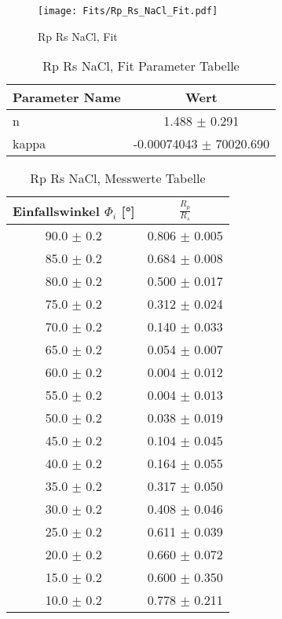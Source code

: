 \begin{figure}[ht] 
 	\centering 
 	\texttt{[image: Fits/Rp\_Rs\_NaCl\_Fit.pdf]} 
	\caption{Rp Rs NaCl, Fit} 
 	\label{fig:Rp Rs NaCl, Fit} 
\end{figure}
 
\begin{table}[ht] 
	\centering 
	\caption{Rp Rs NaCl, Fit Parameter Tabelle} 
	\label{tab: Rp Rs NaCl, Fit Parameter Tabelle}
	\begin{tabular}{|l|c|}
		\hline
		Parameter Name	&	Wert \\ \hline
		n	&	 1.488 $\pm$  0.291\\ \hline
		kappa	&	-0.00074043 $\pm$  70020.690\\ \hline
	\end{tabular} 
\end{table}
 
\begin{table}[ht] 
	\centering 
	\caption{Rp Rs NaCl, Messwerte Tabelle} 
	\label{tab: Rp Rs NaCl, Messwerte Tabelle}
	\begin{tabular}{|c|c|}
		\hline
		Einfallswinkel $\Phi_i$ [°] 	&	 $\frac{R_p}{R_s}$\\ \hline
		90.0 $\pm$ 0.2 	&	 0.806 $\pm$ 0.005 \\ \hline
		85.0 $\pm$ 0.2 	&	 0.684 $\pm$ 0.008 \\ \hline
		80.0 $\pm$ 0.2 	&	 0.500 $\pm$ 0.017 \\ \hline
		75.0 $\pm$ 0.2 	&	 0.312 $\pm$ 0.024 \\ \hline
		70.0 $\pm$ 0.2 	&	 0.140 $\pm$ 0.033 \\ \hline
		65.0 $\pm$ 0.2 	&	 0.054 $\pm$ 0.007 \\ \hline
		60.0 $\pm$ 0.2 	&	 0.004 $\pm$ 0.012 \\ \hline
		55.0 $\pm$ 0.2 	&	 0.004 $\pm$ 0.013 \\ \hline
		50.0 $\pm$ 0.2 	&	 0.038 $\pm$ 0.019 \\ \hline
		45.0 $\pm$ 0.2 	&	 0.104 $\pm$ 0.045 \\ \hline
		40.0 $\pm$ 0.2 	&	 0.164 $\pm$ 0.055 \\ \hline
		35.0 $\pm$ 0.2 	&	 0.317 $\pm$ 0.050 \\ \hline
		30.0 $\pm$ 0.2 	&	 0.408 $\pm$ 0.046 \\ \hline
		25.0 $\pm$ 0.2 	&	 0.611 $\pm$ 0.039 \\ \hline
		20.0 $\pm$ 0.2 	&	 0.660 $\pm$ 0.072 \\ \hline
		15.0 $\pm$ 0.2 	&	 0.600 $\pm$ 0.350 \\ \hline
		10.0 $\pm$ 0.2 	&	 0.778 $\pm$ 0.211 \\ \hline
	\end{tabular} 
\end{table}
 
